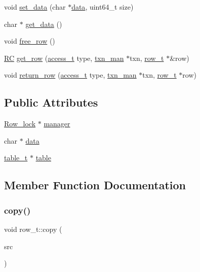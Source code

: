 \begin{DoxyCompactItemize}
\item 
void \hyperlink{classrow__t_a051b2e198e08b7ef586726fb93546673}{set\+\_\+data} (char $\ast$\hyperlink{classrow__t_a8d7d53132f2f84f46785805abec0614c}{data}, uint64\+\_\+t size)
\item 
char $\ast$ \hyperlink{classrow__t_acaf359f8766fda8f8e8dc1669906955b}{get\+\_\+data} ()
\item 
void \hyperlink{classrow__t_a270e2afa4a7d8333f59de89af65a5372}{free\+\_\+row} ()
\item 
\hyperlink{global_8h_a78c49a674c810fdd03d20432f7be864a}{RC} \hyperlink{classrow__t_a49ff4bc52abd5712d2f0a8b9eef5e2bb}{get\+\_\+row} (\hyperlink{global_8h_a567f81b0ae33b00d189d7714e9fde0bc}{access\+\_\+t} type, \hyperlink{classtxn__man}{txn\+\_\+man} $\ast$txn, \hyperlink{classrow__t}{row\+\_\+t} $\ast$\&row)
\item 
void \hyperlink{classrow__t_ad444dabf917bd4f85766f6c80d7ec74f}{return\+\_\+row} (\hyperlink{global_8h_a567f81b0ae33b00d189d7714e9fde0bc}{access\+\_\+t} type, \hyperlink{classtxn__man}{txn\+\_\+man} $\ast$txn, \hyperlink{classrow__t}{row\+\_\+t} $\ast$row)
\end{DoxyCompactItemize}
\subsection*{Public Attributes}
\begin{DoxyCompactItemize}
\item 
\hyperlink{classRow__lock}{Row\+\_\+lock} $\ast$ \hyperlink{classrow__t_a456270f0f263ed713187d5738a7a6e4c}{manager}
\item 
char $\ast$ \hyperlink{classrow__t_a8d7d53132f2f84f46785805abec0614c}{data}
\item 
\hyperlink{classtable__t}{table\+\_\+t} $\ast$ \hyperlink{classrow__t_a22020591ba4e4965d7b2c58172c023f7}{table}
\end{DoxyCompactItemize}


\subsection{Member Function Documentation}
\mbox{\label{classrow__t_aca5bd47c4482a9493da85525298367f4}} 
\subsubsection{\texorpdfstring{copy()}{copy()}}
{\footnotesize\ttfamily void row\+\_\+t\+::copy (\begin{DoxyParamCaption}\item[{\hyperlink{classrow__t}{row\+\_\+t} $\ast$}]{src }\end{DoxyParamCaption})}

